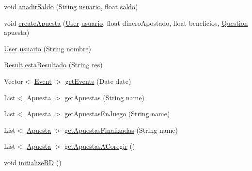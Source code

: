 \begin{DoxyCompactItemize}
\item 
void \mbox{\hyperlink{classbusinessLogic_1_1BLFacadeImplementation_a5e1a613d087a9d566c01d227e21f0b34}{anadir\+Saldo}} (String \mbox{\hyperlink{classbusinessLogic_1_1BLFacadeImplementation_ab32bba3f140f33d176c85bb4ad8527b4}{usuario}}, float \mbox{\hyperlink{classbusinessLogic_1_1BLFacadeImplementation_a2ba616628033f05a5f70a0afddb1c970}{saldo}})
\item 
void \mbox{\hyperlink{classbusinessLogic_1_1BLFacadeImplementation_a301913f0d5beb5b7a7b4d51283a41011}{create\+Apuesta}} (\mbox{\hyperlink{classdomain_1_1User}{User}} \mbox{\hyperlink{classbusinessLogic_1_1BLFacadeImplementation_ab32bba3f140f33d176c85bb4ad8527b4}{usuario}}, float dinero\+Apostado, float beneficios, \mbox{\hyperlink{classdomain_1_1Question}{Question}} apuesta)
\item 
\mbox{\hyperlink{classdomain_1_1User}{User}} \mbox{\hyperlink{classbusinessLogic_1_1BLFacadeImplementation_ab32bba3f140f33d176c85bb4ad8527b4}{usuario}} (String nombre)
\item 
\mbox{\hyperlink{classdomain_1_1Result}{Result}} \mbox{\hyperlink{classbusinessLogic_1_1BLFacadeImplementation_ac0445d578f21530433001bfb7582a175}{esta\+Resultado}} (String res)
\item 
Vector$<$ \mbox{\hyperlink{classdomain_1_1Event}{Event}} $>$ \mbox{\hyperlink{classbusinessLogic_1_1BLFacadeImplementation_a62cba365fc047beb4523773ef8a53644}{get\+Events}} (Date date)
\item 
List$<$ \mbox{\hyperlink{classdomain_1_1Apuesta}{Apuesta}} $>$ \mbox{\hyperlink{classbusinessLogic_1_1BLFacadeImplementation_afbf2b534e813dc7344214b5b8d6ca4de}{get\+Apuestas}} (String name)
\item 
List$<$ \mbox{\hyperlink{classdomain_1_1Apuesta}{Apuesta}} $>$ \mbox{\hyperlink{classbusinessLogic_1_1BLFacadeImplementation_a5cf672ed1cbdef2446948fe5472e9da5}{get\+Apuestas\+En\+Juego}} (String name)
\item 
List$<$ \mbox{\hyperlink{classdomain_1_1Apuesta}{Apuesta}} $>$ \mbox{\hyperlink{classbusinessLogic_1_1BLFacadeImplementation_a6e151a43915c198904fe8cafdb26ed2c}{get\+Apuestas\+Finalizadas}} (String name)
\item 
List$<$ \mbox{\hyperlink{classdomain_1_1Apuesta}{Apuesta}} $>$ \mbox{\hyperlink{classbusinessLogic_1_1BLFacadeImplementation_af1218f1db76137f821a31adc31f47e9f}{get\+Apuestas\+A\+Coregir}} ()
\item 
void \mbox{\hyperlink{classbusinessLogic_1_1BLFacadeImplementation_a5f915c64121f2a6e37af4fc337e88ff0}{initialize\+BD}} ()

\end{DoxyCompactItemize}
